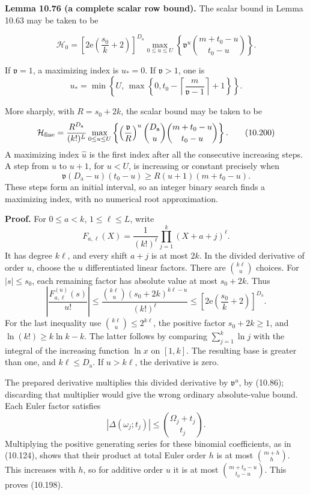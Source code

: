 \documentclass[
  11pt,
  a4paper,
]{article}
\begin{document}
\textbf{Lemma 10.76 (a complete scalar row bound).} The scalar bound in
Lemma 10.63 may be taken to be

\[
\mathcal H_0=
\left[2\mathrm e\left(\frac{s_0}{k}+2\right)\right]^{D_{\mathrm a}}
\max_{0\le u\le U}
\left\{\mathfrak v^u
\binom{m+t_0-u}{t_0-u}\right\}.
\tag{10.198}
\]

If \(\mathfrak v=1\), a maximizing index is \(u_*=0\). If
\(\mathfrak v>1\), one is \[
u_*=\min\left\{U,\,
\max\left\{0,t_0-\left\lceil\frac m{\mathfrak v-1}\right\rceil+1\right\}\right\}.
\tag{10.199}
\]

More sharply, with \(R=s_0+2k\), the scalar bound may be taken to be \[
\mathcal H_{\rm fine}=
\frac{R^{D_{\mathrm a}}}{(k!)^L}
\max_{0\le u\le U}
\left\{\left(\frac{\mathfrak v}{R}\right)^u
\binom{D_{\mathrm a}}u
\binom{m+t_0-u}{t_0-u}\right\}.
\tag{10.200}
\] A maximizing index \(\widehat u\) is the first index after all the
consecutive increasing steps. A step from \(u\) to \(u+1\), for \(u<U\),
is increasing or constant precisely when \[
\mathfrak v(D_{\mathrm a}-u)(t_0-u)
\ge R(u+1)(m+t_0-u).
\tag{10.201}
\] These steps form an initial interval, so an integer binary search
finds a maximizing index, with no numerical root approximation.

\textbf{Proof.} For \(0\le a<k\), \(1\le\ell\le L\), write \[
F_{a,\ell}(X)=\frac1{(k!)^\ell}
\prod_{j=1}^k(X+a+j)^\ell.
\] It has degree \(k\ell\), and every shift \(a+j\) is at most \(2k\).
In the divided derivative of order \(u\), choose the \(u\)
differentiated linear factors. There are \(\binom{k\ell}{u}\) choices.
For \(|s|\le s_0\), each remaining factor has absolute value at most
\(s_0+2k\). Thus \[
\left|\frac{F_{a,\ell}^{(u)}(s)}{u!}\right|
\le \frac{\binom{k\ell}{u}(s_0+2k)^{k\ell-u}}{(k!)^\ell}
\le\left[2\mathrm e\left(\frac{s_0}{k}+2\right)\right]^{D_{\mathrm a}}.
\] For the last inequality use \(\binom{k\ell}{u}\le2^{k\ell}\), the
positive factor \(s_0+2k\ge1\), and \(\ln(k!)\ge k\ln k-k\). The latter
follows by comparing \(\sum_{j=1}^k\ln j\) with the integral of the
increasing function \(\ln x\) on \([1,k]\). The resulting base is
greater than one, and \(k\ell\le D_{\mathrm a}\). If \(u>k\ell\), the
derivative is zero.

The prepared derivative multiplies this divided derivative by
\(\mathfrak v^u\), by (10.86); discarding that multiplier would give the
wrong ordinary absolute-value bound. Each Euler factor satisfies \[
|\Delta(\omega_j;t_j)|
\le\binom{\Omega_j+t_j}{t_j}.
\] Multiplying the positive generating series for these binomial
coefficients, as in (10.124), shows that their product at total Euler
order \(h\) is at most \(\binom{m+h}{h}\). This increases with \(h\), so
for additive order \(u\) it is at most \(\binom{m+t_0-u}{t_0-u}\). This
proves (10.198).
\end{document}
